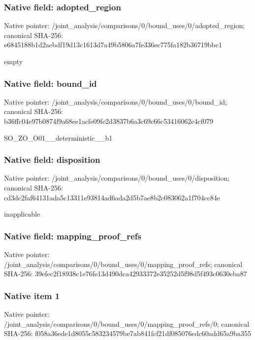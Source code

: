 \documentclass[10pt,a4paper]{article}
\begin{document}
\subsubsection{Native field: adopted\_region}


Native pointer: /joint\_analysis/comparis\allowbreak{}ons/0/bound\_uses/0/adopt\allowbreak{}ed\_region; canonical SHA-256: e6845188b1d2aebdf19d13c1\allowbreak{}613d7a49b5806a7fe336ec77\allowbreak{}5fa182b36719bbc1


empty


\subsubsection{Native field: bound\_id}


Native pointer: /joint\_analysis/comparis\allowbreak{}ons/0/bound\_uses/0/bound\allowbreak{}\_id; canonical SHA-256: b36ffc04e97b0874f9a68ee1\allowbreak{}acfe09fe2d3837b6a3c69c66\allowbreak{}c53416062e4cf079


SO\_ZO\_O01\_\_deterministic\_\_b1


\subsubsection{Native field: disposition}


Native pointer: /joint\_analysis/comparis\allowbreak{}ons/0/bound\_uses/0/dispo\allowbreak{}sition; canonical SHA-256: cd3dc2faf64131ada5c13311\allowbreak{}e93814ad6ada2d5b7ae8b2c0\allowbreak{}83062a1f704cc84e


inapplicable


\subsubsection{Native field: mapping\_proof\_refs}


Native pointer: /joint\_analysis/comparis\allowbreak{}ons/0/bound\_uses/0/mappi\allowbreak{}ng\_proof\_refs; canonical SHA-256: 39efec2f18938c1e76fe13d4\allowbreak{}90dca42933372e35252d5f98\allowbreak{}d5f493c0630eba87



\subsubsection{Native item 1}


Native pointer: /joint\_analysis/comparis\allowbreak{}ons/0/bound\_uses/0/mappi\allowbreak{}ng\_proof\_refs/0; canonical SHA-256: f058a36ede1d8055c5832345\allowbreak{}79be7ab841fcf21df085076e\allowbreak{}dc60add65a9ba355
\end{document}
